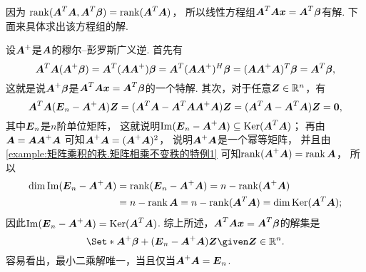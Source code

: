 因为 \hyperref[example:线性方程组有解的充分必要条件.最小二乘解的存在性]{$\rank(\vb{A}^T \vb{A}, \vb{A}^T \vb\beta) = \rank(\vb{A}^T \vb{A})$}，
所以线性方程组\(\vb{A}^T \vb{A} \vb{x} = \vb{A}^T \vb\beta\)有解.
下面来具体求出该方程组的解.

\begingroup  %
设\(\vb{A}^+\)是\(\vb{A}\)的穆尔--彭罗斯广义逆.
首先有\begin{equation*}
	\vb{A}^T \vb{A} (\vb{A}^+ \vb\beta)
	= \vb{A}^T (\vb{A} \vb{A}^+) \vb\beta
	= \vb{A}^T (\vb{A} \vb{A}^+)^H \vb\beta
	= (\vb{A} \vb{A}^+ \vb{A})^T \vb\beta
	= \vb{A}^T \vb\beta,
\end{equation*}
这就是说\(\vb{A}^+ \vb\beta\)是\(\vb{A}^T \vb{A} \vb{x} = \vb{A}^T \vb\beta\)的一个特解.
其次，对于任意\(\vb{Z} \in \mathbb{R}^n\)，有\begin{equation*}
	\vb{A}^T \vb{A} (\vb{E}_n - \vb{A}^+ \vb{A}) \vb{Z}
	= (\vb{A}^T \vb{A} - \vb{A}^T \vb{A} \vb{A}^+ \vb{A}) \vb{Z}
	= (\vb{A}^T \vb{A} - \vb{A}^T \vb{A}) \vb{Z}
	= \vb0,
\end{equation*}
其中\(\vb{E}_n\)是\(n\)阶单位矩阵，
这就说明\(
	\Im(\vb{E}_n - \vb{A}^+ \vb{A})
	\subseteq
	\Ker(\vb{A}^T \vb{A})
\)；
再由\(\vb{A} = \vb{A} \vb{A}^+ \vb{A}\)
可知\(
	\vb{A}^+ \vb{A}
	= (\vb{A}^+ \vb{A})^2
\)，
说明\(\vb{A}^+ \vb{A}\)是一个幂等矩阵，
并且由\cref{example:矩阵乘积的秩.矩阵相乘不变秩的特例1} 可知\(\rank(\vb{A}^+ \vb{A}) = \rank\vb{A}\)，
所以\begin{align*}
	\dim\Im(\vb{E}_n - \vb{A}^+ \vb{A})
	&= \rank(\vb{E}_n - \vb{A}^+ \vb{A})
	= n - \rank(\vb{A}^+ \vb{A}) \\
	&= n - \rank\vb{A}
	= n - \rank(\vb{A}^T \vb{A})
	= \dim\Ker(\vb{A}^T \vb{A});
\end{align*}
因此\(
	\Im(\vb{E}_n - \vb{A}^+ \vb{A})
	= \Ker(\vb{A}^T \vb{A})
\).
综上所述，\(\vb{A}^T \vb{A} \vb{x} = \vb{A}^T \vb\beta\)的解集是\begin{equation*}
	\Set*{
		\vb{A}^+ \vb\beta
		+ (\vb{E}_n - \vb{A}^+ \vb{A}) \vb{Z}
		\given
		\vb{Z} \in \mathbb{R}^n
	}.
\end{equation*}
\endgroup
容易看出，最小二乘解唯一，当且仅当\(\vb{A}^+ \vb{A} = \vb{E}_n\).

